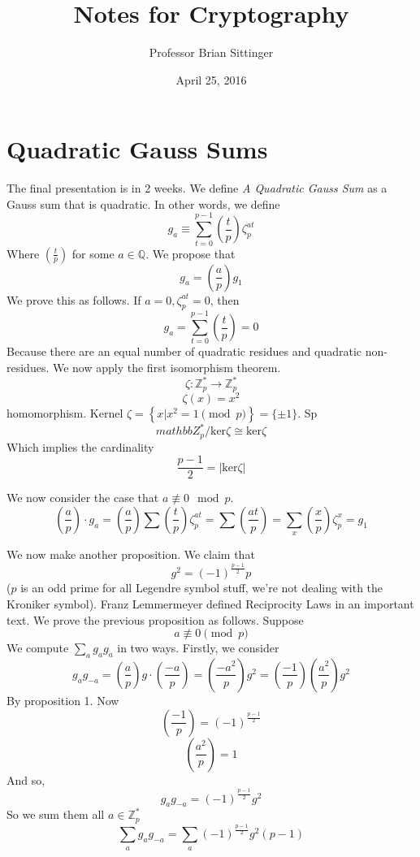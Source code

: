 \documentclass{article}
\title{Notes for Cryptography}
\author{Professor Brian Sittinger}
\date{April 25, 2016}
\begin{document}
\maketitle
\section{Quadratic Gauss Sums}
The final presentation is in 2 weeks. We define \emph{A Quadratic Gauss Sum} as
a Gauss sum that is quadratic. In other words, we define
\[ g_{a} \equiv \sum_{t = 0}^{p-1} \left( \frac{t}{p} \right) \zeta_p^{at} \]
Where $\left(\frac{t}{p}\right)$ for some $a \in \mathbb{Q}$.
We propose that
\[ g_a = \left( \frac{a}{p} \right) g_{1} \]
We prove this as follows. If $a = 0, \zeta_p^{at} = 0$, then
\[ g_a = \sum_{t = 0}^{p-1} \left( \frac{t}{p} \right) = 0 \]
Because there are an equal number of quadratic residues and quadratic
non-residues. We now apply the first isomorphism theorem. 
\[ \zeta : \mathbb{Z}_p^* \rightarrow \mathbb{Z}_p^* \]
\[ \zeta(x) = x^2 \]
homomorphism. Kernel $\zeta = \left\{ x | x^2 = 1 \pmod{p} \right\} = \{ \pm 1
\} $. Sp
\[ mathbb{Z}_p^* / \text{ker}\zeta \cong \text{ker}\zeta \]
Which implies the cardinality
\[ \frac{p-1}{2} = |\text{ker} \zeta| \]

We now consider the case that $a \not\equiv 0 \mod{p}$. 
\[ \left(\frac{a}{p}\right) \cdot g_a = \left(\frac{a}{p}\right)
\sum\left(\frac{t}{p}\right)\zeta_p^{at} =
\sum\left(\frac{at}{p}\right) = \sum_x \left(\frac{x}{p}\right) \zeta^x_p = g_1
\]

We now make another proposition. We claim that
\[ g^2 = (-1)^{\frac{p-1}{2}} p \]
($p$ is an odd prime for all Legendre symbol stuff, we're not dealing with the
Kroniker symbol). Franz Lemmermeyer defined Reciprocity Laws in an important
text. We prove the previous proposition as follows. Suppose
\[ a \not\equiv 0 \pmod{p} \]
We compute $\sum_{a} g_a g_a $ in two ways. Firstly, we consider
\[ g_a g_{-a} = \left(\frac{a}{p}\right)g\cdot\left(\frac{-a}{p}\right) =
\left(\frac{-a^2}{p}\right)g^2 = \left(\frac{-1}{p}\right)
\left(\frac{a^2}{p}\right) g^2  \] 
By proposition 1. Now
\[ \left(\frac{-1}{p}\right) = (-1)^{\frac{p-1}{2}} \]
\[ \left(\frac{a^2}{p}\right) = 1 \]
And so, 
\[ g_a g_{-a} = (-1)^{\frac{p-1}{2}} g^2 \]
So we sum them all $a \in \mathbb{Z}_p^*$
\[ \sum_{a} g_a g_{-a}  = \sum_a (-1)^{\frac{p-1}{2}} g^2(p-1) \]
\end{document}
